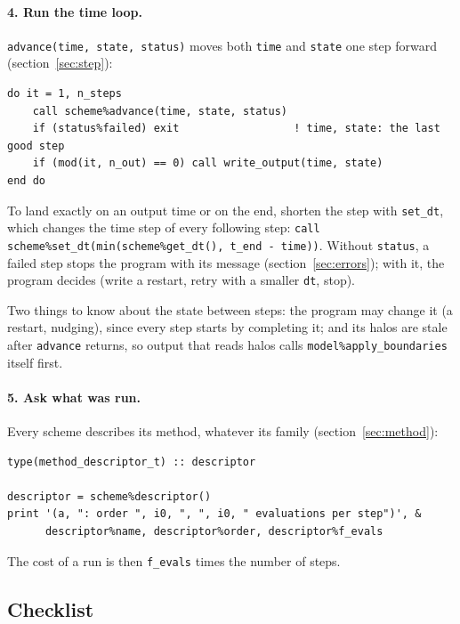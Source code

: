 \documentclass[11pt,a4paper]{article}
\newcommand{\code}[1]{\texttt{#1}}
\begin{document}
\paragraph{4. Run the time loop.} \code{advance(time, state, status)} moves
both \code{time} and \code{state} one step forward
(section~\ref{sec:step}):
\begin{lstlisting}
do it = 1, n_steps
    call scheme%advance(time, state, status)
    if (status%failed) exit                  ! time, state: the last good step
    if (mod(it, n_out) == 0) call write_output(time, state)
end do
\end{lstlisting}
To land exactly on an output time or on the end, shorten the step with
\code{set\_dt}, which changes the time step of every following step:
\code{call scheme\%set\_dt(min(scheme\%get\_dt(), t\_end - time))}. Without
\code{status}, a failed step stops the program with its message
(section~\ref{sec:errors}); with it, the program decides (write a restart,
retry with a smaller \code{dt}, stop).

Two things to know about the state between steps: the program may change it
(a restart, nudging), since every step starts by completing it; and its
halos are stale after \code{advance} returns, so output that reads halos
calls \code{model\%apply\_boundaries} itself first.

\paragraph{5. Ask what was run.} Every scheme describes its method, whatever
its family (section~\ref{sec:method}):
\begin{lstlisting}
type(method_descriptor_t) :: descriptor

descriptor = scheme%descriptor()
print '(a, ": order ", i0, ", ", i0, " evaluations per step")', &
      descriptor%name, descriptor%order, descriptor%f_evals
\end{lstlisting}
The cost of a run is then \code{f\_evals} times the number of steps.

\subsection{Checklist}
\end{document}
